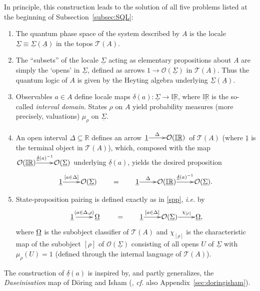 \documentclass[12pt]{article}
\newcommand{\inv}{^{-1}}
\newcommand{\er}{\eqref}
\newcommand{\dl}{\delta} \newcommand{\Dl}{\Delta}
\newcommand{\CO}{{\mathcal O}} \newcommand{\CP}{{\mathcal P}}
\newcommand{\alg}[1]{\ensuremath{#1}}
\newcommand{\functor}[1]{\ensuremath{\underline{#1}}}
\newcommand{\asstopos}{\ensuremath{\mathcal{T}}}
\newcommand{\field}[1]{\ensuremath{\mathbb{#1}}}
\newcommand{\uS}{\underline{\Sigma}}
\newcommand{\uA}{\underline{A}}
\newcommand{\TA}{\mathcal{T}(A)}
\newcommand{\ie}{\textit{i.e.}}
\newcommand{\ulS}{\functor{\Sigma}}
\renewcommand{\TA}{\asstopos(\alg{A})}
\begin{document}
In principle, this construction leads to the solution of all five problems
listed at the beginning of Subsection~\ref{subsec:SQL}:
\begin{enumerate}
\item  The quantum phase space of the system described by $A$ is the
  locale $\ulS\equiv\ulS(\uA)$ in the topos $\TA$.
\item The  ``subsets'' of the locale $\ulS$  acting as elementary
  propositions about $A$ are simply the `opens' in $\ulS$, defined as
  arrows $1\to\CO(\ulS)$ in $\TA$. Thus the quantum logic
  of $A$ is given by the Heyting algebra underlying $\ulS(\uA)$.
\item Observables $a\in A$ define locale maps $\dl(a):
  \ulS\to\underline{\mathbb{IR}}$, where $\underline{\mathbb{IR}}$ is
  the so-called {\it interval domain}. States $\rho$ on $A$ yield
  probability measures (more precisely, valuations) $\mu_{\rho}$ on
  $\ulS$.
\item An open interval $\Dl\subseteq \mathbb{R}$ defines an arrow
  $\xymatrix@1{\underline{1} \ar^-{\Delta}[r] &
  \CO(\underline{\field{IR}})}$ of $\TA$ (where $\underline{1}$ is the
  terminal object in $\TA$), which, composed with the map
  $\xymatrix@1{\CO(\underline{\mathbb{IR}}) \ar^-{\underline{\dl}(a)\inv}[r] & \CO(\ulS)}$
  underlying $\underline{\dl}(a)$, yields the desired proposition
  \[
    \xymatrix@1{\underline{1} \ar^-{[a \in \Delta]}[r] & \CO(\uS)}
    \qquad =\qquad
    \xymatrix@1{\underline{1} \ar^-{\Delta}[r] &
    \CO(\underline{\field{IR}}) \ar^-{\underline{\dl}(a)\inv}[r] & \CO(\ulS).}
  \]
\item State-proposition pairing is defined exactly as in \er{spp}, \ie
  by
  \begin{equation}
   \xymatrix{\underline{1} \ar^-{\langle a\in \Dl,\rho \rangle}[r] & \underline{\Om}}
   \qquad =\qquad
   \xymatrix@1{\underline{1} \ar^-{[a \in \Delta]}[r] & \CO(\ulS)
   \ar^-{\chi_{[\rho]}}[r] & \underline{\Om},}
   \label{sppbis}
 \end{equation}
  where $\underline{\Omega}$ is the subobject classifier of $\TA$ and
  $\chi_{[\rho]}$ is the characteristic map of the subobject $[\rho]$
  of $\CO(\ulS)$ consisting of all opens $U$ of $\ulS$ with
  $\mu_{\rho}(U)=1$ (defined  through the internal language of
  $\TA$).
\end{enumerate}
The construction of $\underline{\dl}(a)$ is inspired by, and partly generalizes,
the {\it Daseinisation} map of D\"{o}ring and Isham (\cite{doringisham2,
doringisham3}, \textit{cf.} also Appendix~\ref{sec:doringisham}).
\end{document}
